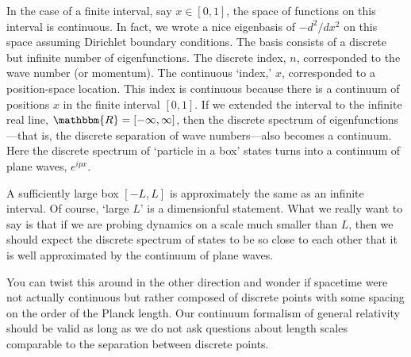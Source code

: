 
\begin{example}
In the case of a finite interval, say $x\in [0,1]$, the space of functions on this interval is continuous. In fact, we wrote a nice eigenbasis of $-d^2/dx^2$ on this space assuming Dirichlet boundary conditions. The basis consists of a discrete but infinite number of eigenfunctions. The discrete index, $n$, corresponded to the wave number (or momentum). The continuous `index,' $x$, corresponded to a position-space location. This index is continuous because there is a continuum of positions $x$ in the finite interval $[0,1]$. If we extended the interval to the infinite real line, $\mathbbm{R} = [-\infty, \infty]$, then the discrete spectrum of eigenfunctions---that is, the discrete separation of wave numbers---also becomes a continuum. Here the discrete spectrum of `particle in a box' states turns into a continuum of plane waves, $e^{ipx}$. 

A sufficiently large box $[-L,L]$ is approximately the same as an infinite interval. Of course, `large $L$' is a dimensionful statement. What we really want to say is that if we are probing dynamics on a scale much smaller than $L$, then we should expect the discrete spectrum of states to be so close to each other that it is well approximated by the continuum of plane waves. 

You can twist this around in the other direction and wonder if spacetime were not actually continuous but rather composed of discrete points with some spacing on the order of the Planck length. Our continuum formalism of general relativity should be valid as long as we do not ask questions about length scales comparable to the separation between discrete points. 
\end{example}


